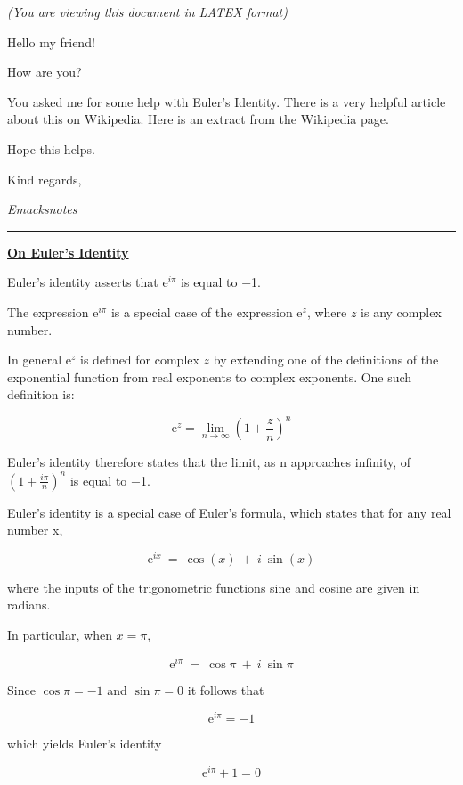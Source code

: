 \documentclass[11pt]{article}
\author{emacksnotes}
\date{\today}
\title{}
\begin{document}
\tableofcontents

\begin{center}
\emph{(You are viewing this document in LATEX format)}
\end{center}

Hello  my friend!

How are you?

You asked me for some help with Euler's Identity. There is a very helpful article about this on
Wikipedia.  Here is an extract from the Wikipedia page.

Hope this helps.

Kind regards,

\emph{Emacksnotes}

\noindent\rule{\textwidth}{0.5pt}

\begin{center}
\uline{\textbf{On Euler's Identity}}
\end{center}

Euler's identity asserts that \(\mathrm{e}^{i\pi }\) is equal to −1.

The expression \(\mathrm{e}^{i\pi}\) is a special case of the
expression \(\mathrm{e}^{z}\), where \(z\) is any complex number.

In general \(\mathrm{e}^{z}\) is defined for complex \(z\) by
extending one of the definitions of the exponential function from real exponents to complex
exponents. One such definition is:

$$\mathrm{e}^{z}=\lim _{n\rightarrow \infty }\left(1+\frac{z}{n}\right)^{n}$$

Euler's identity therefore states that the limit, as n approaches infinity, of
\(\left(1+\frac{i\pi }{n}\right)^{n}\) is
equal to −1.

Euler's identity is a special case of Euler's formula, which states that for any real number x,

$$\mathrm{e}^{ix}\ =\ \cos (x)\ +\ i\ \sin (x)$$

where the inputs of the trigonometric functions sine and cosine are given in radians.

In particular, when \(x=\pi\),

$$\mathrm{e}^{i\pi }\ =\ \cos \pi \ +\ i\ \sin \pi $$

Since \(\cos \pi =-1\) and \(\sin \pi =0\)
it follows that

$$\mathrm{e}^{i\pi }=-1$$

which yields Euler's identity

$$\mathrm{e}^{i\pi }+1=0$$
\end{document}
